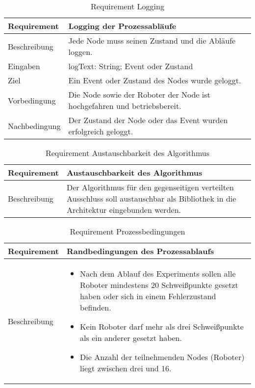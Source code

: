 \begin{table}[h!]
\begin{center}
\begin{tabular}{ |p{2.5cm}|p{11cm}| } 
 \hline
 Requirement & Logging der Prozessabläufe \\
 \hline
 Beschreibung & Jede Node muss seinen Zustand und die Abläufe loggen. \\
 \hline
 Eingaben & logText: String; Event oder Zustand \\
 \hline
 Ziel & Ein Event oder Zustand des Nodes wurde geloggt. \\
 \hline
 Vorbedingung & Die Node sowie der Roboter der Node ist hochgefahren und betriebsbereit. \\
 \hline
 Nachbedingung & Der Zustand der Node oder das Event wurden erfolgreich geloggt. \\
 \hline
\end{tabular}
\caption{Requirement Logging}
\label{table:reqlogging}
\end{center}
\end{table}

\begin{table}[h!]
\begin{center}
\begin{tabular}{ |p{2.5cm}|p{11cm}| } 
 \hline
 Requirement & Austauschbarkeit des Algorithmus \\
 \hline
 Beschreibung & Der Algorithmus für den gegenseitigen verteilten Ausschluss soll austauschbar als Bibliothek
 in die Architektur eingebunden werden.\\
 \hline
\end{tabular}
\caption{Requirement Austauschbarkeit des Algorithmus}
\label{table:reqmutexexchangable}
\end{center}
\end{table}

\begin{table}[h!]
\begin{center}
\begin{tabular}{ |p{2.5cm}|p{11cm}| } 
 \hline
 Requirement & Randbedingungen des Prozessablaufs \\
 \hline
 Beschreibung &
 \begin{itemize}
  \item Nach dem Ablauf des Experiments sollen alle Roboter mindestens 20 Schweißpunkte
  gesetzt haben oder sich in einem Fehlerzustand befinden.
  \item Kein Roboter darf mehr als drei Schweißpunkte als ein anderer gesetzt haben.
  \item Die Anzahl der teilnehmenden Nodes (Roboter) liegt zwischen drei und 16.
 \end{itemize} \\
 \hline
\end{tabular}
\caption{Requirement Prozessbedingungen}
\label{table:reqprocess}
\end{center}
\end{table}

